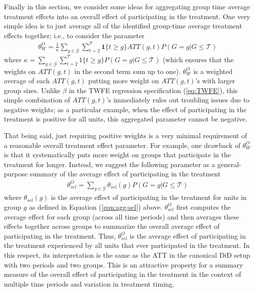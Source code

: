 \documentclass[11pt]{article}%
\theoremstyle{plain}
\numberwithin{sassumption}{section}
\numberwithin{equation}{section}
\begin{document}
Finally in this section, we consider some ideas for aggregating group time
average treatment effects into an overall effect of participating in the
treatment. One very simple idea is to just average all of the identified
group-time average treatment effects together; i.e., to consider the
parameter
\begin{align}
\label{eqn:avg-overall}\theta_{W}^{O}=\frac{1}{\kappa}\sum_{g\in\mathcal{G}%
}\sum_{t=2}^{\mathcal{T}}\mathbf{1}\{t\geq g\}ATT(g,t)P(G=g|G\leq\mathcal{T})
\end{align}
where $\kappa=\sum_{g\in\mathcal{G}}\sum_{t=2}^{\mathcal{T}}1\{t\geq
g\}P(G=g|G\leq\mathcal{T})$ (which ensures that the weights on $ATT(g,t)$ in
the second term sum up to one). $\theta_{W}^{O}$ is a weighted average of each
$ATT(g,t)$ putting more weight on $ATT(g,t)$'s with larger group sizes. Unlike
$\beta$ in the TWFE regression specification (\ref{eq:TWFE}), this simple
combination of $ATT(g,t)$'s immediately rules out troubling issues due to
negative weights; as a particular example, when the effect of participating in
the treatment is positive for all units, this aggregated parameter cannot be negative.

That being said, just requiring positive weights is a very minimal requirement
of a reasonable overall treatment effect parameter. For example, one drawback
of $\theta_{W}^{O}$ is that it systematically puts more weight on groups that
participate in the treatment for longer. Instead, we suggest the following
parameter as a general-purpose summary of the average effect of participating
in the treatment
\begin{align}
\label{eqn:sel-overall}\theta_{sel}^{O}=\sum_{g\in\mathcal{G}}\theta
_{sel}(g)P(G=g|G\leq\mathcal{T})
\end{align}
where $\theta_{sel}(g)$ is the average effect of participating in the
treatment for units in group $g$ as defined in Equation (\ref{eqn:agg-sel})
above. $\theta^{O}_{sel}$ first computes the average effect for each group
(across all time periods) and then averages these effects together across
groups to summarize the overall average effect of participating in the
treatment. Thus, $\theta^{O}_{sel}$ is the average effect of participating in
the treatment experienced by all units that ever participated in the
treatment. In this respect, its interpretation is the same as the ATT in the
canonical DiD setup with two periods and two groups.
This is an attractive property for a summary measure of the overall effect of
participating in the treatment in the context of multiple time periods and
variation in treatment timing.
\end{document}
